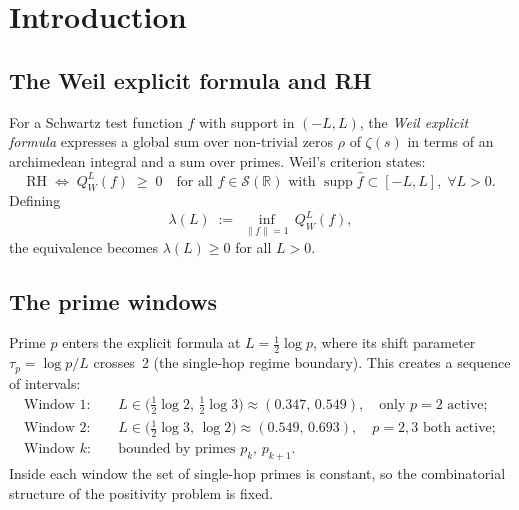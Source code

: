 \documentclass[12pt,a4paper]{amsart}
\theoremstyle{plain}
\theoremstyle{definition}
\newcommand{\R}{\mathbb{R}}
\begin{document}
\maketitle

\tableofcontents

\section{Introduction}
\label{sec:intro}

\subsection{The Weil explicit formula and RH}

For a Schwartz test function $f$ with support in $(-L,L)$, the \emph{Weil
explicit formula} expresses a global sum over non-trivial zeros $\rho$ of
$\zeta(s)$ in terms of an archimedean integral and a sum over primes.
Weil's criterion states:
\[
  \text{RH} \;\Longleftrightarrow\;
  Q_W^L(f) \;\ge\; 0 \quad
  \text{for all } f \in \mathcal{S}(\R) \text{ with }
  \operatorname{supp}\hat f \subset [-L,L],\;
  \forall L > 0.
\]
Defining
\[
  \lambda(L) \;:=\; \inf_{\|f\|=1}\, Q_W^L(f),
\]
the equivalence becomes $\lambda(L) \ge 0$ for all $L > 0$.

\subsection{The prime windows}

Prime $p$ enters the explicit formula at $L = \tfrac12\log p$, where its shift
parameter $\tau_p = \log p / L$ crosses~2 (the single-hop regime boundary).
This creates a sequence of intervals:
\begin{align*}
  \text{Window 1:}&\quad L \in \bigl(\tfrac12\log 2,\, \tfrac12\log 3\bigr)
    \approx (0.347,\, 0.549), \quad \text{only } p=2 \text{ active};\\
  \text{Window 2:}&\quad L \in \bigl(\tfrac12\log 3,\, \log 2\bigr)
    \approx (0.549,\, 0.693), \quad p=2,3 \text{ both active};\\
  \text{Window } k{:}& \quad \text{bounded by primes } p_k,\, p_{k+1}.
\end{align*}
Inside each window the set of single-hop primes is constant, so the
combinatorial structure of the positivity problem is fixed.
\end{document}
